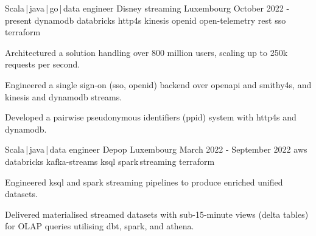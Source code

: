 
\newcommand*{\logo}[2]{\raisebox{-0.2em}{\texttt{[image: \#2]}}\hspace{0.25em}#1}
\newcommand*{\logoonly}[1]{\raisebox{-0.2em}{\texttt{[image: \#1]}}}


\begin{cventries}
    \cventry
    {Scala\,|\,java\,|\,go\,|\,data engineer}
    {\logo{Disney streaming}{../../../images/disney.png}} %
    {Luxembourg} %
    {October 2022 - present} %
    {dynamodb {} databricks {} http4s {} kinesis {} openid {}  open-telemetry {} rest {} sso {} terraform}
    {
        \begin{cvitems}
            \item{Architectured a solution handling over 800 million users, scaling up to 250k requests per second.}
            \item{Engineered a single sign-on (sso, openid) backend over openapi and smithy4s, and kinesis and dynamodb streams.}
            \item{Developed a pairwise pseudonymous identifiers (ppid) system with http4s and dynamodb.}
        \end{cvitems}
    }

    \cventry
    {Scala\,|\,java\,|\,data engineer}
    {\logo{Depop}{../../../images/depop.jpg}} %
    {Luxembourg} %
    {March 2022 - September 2022} %
    {aws {} databricks {} kafka-streams {} ksql {} spark\,streaming {} terraform}
    {
        \begin{cvitems}
            \item{Engineered ksql and spark streaming pipelines to produce enriched unified datasets.}
            \item{Delivered materialised streamed datasets with sub-15-minute views (delta tables) for OLAP queries utilising dbt, spark, and athena.}
        \end{cvitems}
    }



\end{cventries}
